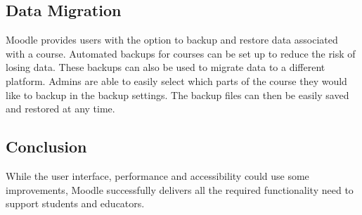 \subsection{Data Migration}
Moodle provides users with the option to backup and restore data associated with a course. \cite{moodleBackupAndRestore}
Automated backups for courses can be set up to reduce the risk of losing data.
These backups can also be used to migrate data to a different platform. \cite{moodleBackup}
Admins are able to easily select which parts of the course they would like to backup in the backup settings.
The backup files can then be easily saved and restored at any time. \cite{moodleRestore}

\subsection{Conclusion}
While the user interface, performance and accessibility could use some improvements, Moodle successfully delivers all the required functionality need to support students and educators.